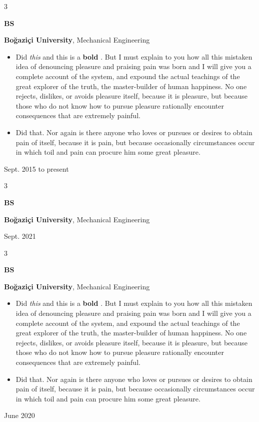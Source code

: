 \documentclass[10pt, letterpaper]{article}
\newenvironment{highlights}{
    \begin{itemize}[
        topsep=0.10 cm,
        parsep=0.10 cm,
        partopsep=0pt,
        itemsep=0pt,
        leftmargin=0.4 cm + 10pt
    ]
}{
    \end{itemize}
} %
\newenvironment{threecolentry}[3][]{
    \onecolentry
    \def\thirdColumn{#3}
    \setcolumnwidth{1 cm, \fill, 4.5 cm}
    \begin{paracol}{3}
    {\raggedright #2} \switchcolumn
}{
    \switchcolumn \raggedleft \thirdColumn
    \end{paracol}
    \endonecolentry
} %
\let\hrefWithoutArrow\href
\renewcommand{\href}[2]{\hrefWithoutArrow{#1}{\mbox{\ifthenelse{\equal{#2}{}}{ }{#2 }\raisebox{.15ex}{\footnotesize \faExternalLink*}}}}
\begin{document}
        \begin{threecolentry}{\textbf{BS}}{
            Sept. 2015 to present
        }
            \textbf{Boğaziçi University}, Mechanical Engineering
            \begin{highlights}
                \item Did \textit{this} and this is a \textbf{bold} \href{https://example.com}{link}. But I must explain to you how all this mistaken idea of denouncing pleasure and praising pain was born and I will give you a complete account of the system, and expound the actual teachings of the great explorer of the truth, the master-builder of human happiness. No one rejects, dislikes, or avoids pleasure itself, because it is pleasure, but because those who do not know how to pursue pleasure rationally encounter consequences that are extremely painful.
                \item Did that. Nor again is there anyone who loves or pursues or desires to obtain pain of itself, because it is pain, but because occasionally circumstances occur in which toil and pain can procure him some great pleasure.
            \end{highlights}
        \end{threecolentry}

        \vspace{0.2 cm}

        \begin{threecolentry}{\textbf{BS}}{
            Sept. 2021
        }
            \textbf{Boğaziçi University}, Mechanical Engineering
        \end{threecolentry}

        \vspace{0.2 cm}

        \begin{threecolentry}{\textbf{BS}}{
            June 2020
        }
            \textbf{Boğaziçi University}, Mechanical Engineering
            \begin{highlights}
                \item Did \textit{this} and this is a \textbf{bold} \href{https://example.com}{link}. But I must explain to you how all this mistaken idea of denouncing pleasure and praising pain was born and I will give you a complete account of the system, and expound the actual teachings of the great explorer of the truth, the master-builder of human happiness. No one rejects, dislikes, or avoids pleasure itself, because it is pleasure, but because those who do not know how to pursue pleasure rationally encounter consequences that are extremely painful.
                \item Did that. Nor again is there anyone who loves or pursues or desires to obtain pain of itself, because it is pain, but because occasionally circumstances occur in which toil and pain can procure him some great pleasure.
            \end{highlights}
        \end{threecolentry}
\end{document}
